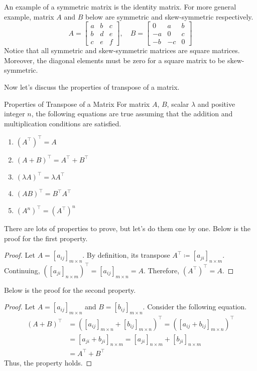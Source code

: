 \documentclass[../main.tex]{subfiles}
\begin{document}
An example of a symmetric matrix is the identity matrix. For more
general example, matrix $A$ and $B$ below are symmetric and
skew-symmetric respectively.
\[
A =
\begin{bmatrix}
    a & b & c \\
    b & d & e \\
    c & e & f
\end{bmatrix},
\quad
B =
\begin{bmatrix}
    0  & a  & b \\
    -a & 0  & c \\
    -b & -c & 0
\end{bmatrix}
\]
Notice that all symmetric and skew-symmetric matrices are square
matrices. Moreover, the diagonal elements must be zero for a
square matrix to be skew-symmetric.

Now let's discuss the properties of transpose of a matrix.

\begin{theorem}{Properties of Transpose of a Matrix}
For matrix $A$, $B$, scalar $\lambda$ and positive integer $n$,
the following equations are true assuming that the addition and
multiplication conditions are satisfied.
\begin{enumerate}
\item $(A^\intercal)^\intercal = A$
\item $(A + B)^\intercal = A^\intercal + B^\intercal$
\item $(\lambda A)^\intercal = \lambda A^\intercal$
\item $(AB)^\intercal = B^\intercal A^\intercal$
\item $(A^n)^\intercal = (A^\intercal)^n$
\end{enumerate}
\end{theorem}

There are lots of properties to prove, but let's do them one by one.
Below is the proof for the first property.

\begin{proof}
Let $A = [a_{ij}]_{m \times n}$. By definition, its transpose
$A^\intercal \coloneqq [a_{ji}]_{n \times m}$. Continuing,
$\left( [a_{ji}]_{n \times m} \right)^\intercal =
[a_{ij}]_{m \times n} = A$. Therefore, $(A^\intercal)^\intercal = A$.
\end{proof}

Below is the proof for the second property.

\begin{proof}
Let $A = [a_{ij}]_{m \times n}$ and $B = [b_{ij}]_{m \times n}$.
Consider the following equation.
\begin{align*}
(A + B)^\intercal
&= \left(
    [a_{ij}]_{m \times n} + [b_{ij}]_{m \times n}
\right)^\intercal
= \left(
    [a_{ij} + b_{ij}]_{m \times n}
\right)^\intercal \\
&= [a_{ji} + b_{ji}]_{n \times m}
= [a_{ji}]_{n \times m} + [b_{ji}]_{n \times m} \\
&= A^\intercal + B^\intercal
\end{align*}
Thus, the property holds.
\end{proof}
\end{document}
